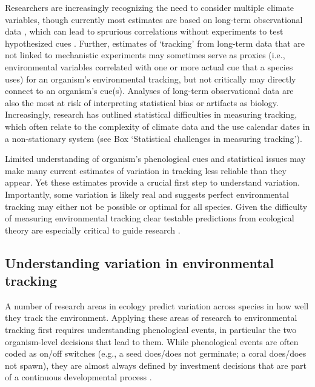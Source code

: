 \documentclass[11pt,letterpaper]{article}
\begin{document}
Researchers are increasingly recognizing the need to consider multiple climate variables, though currently most estimates are based on long-term observational data \citep[e.g.,][]{chmiel2013,simmonds2019}, which can lead to sprurious correlations without experiments to test hypothesized cues \citep{chuinearees}. Further, estimates of `tracking' from long-term data that are not linked to mechanistic experiments may sometimes serve as proxies (i.e., environmental variables correlated with one or more actual cue that a species uses) for an organism's environmental tracking, but not critically may directly connect to an organism's cue(s). Analyses of long-term observational data are also the most at risk of interpreting statistical bias or artifacts as biology. Increasingly, research has outlined statistical difficulties in measuring tracking, which often relate to the complexity of climate data and the use calendar dates in a non-stationary system (see Box `Statistical challenges in measuring tracking'). 

Limited understanding of organism's phenological cues and statistical issues may make many current estimates of variation in tracking less reliable than they appear. Yet these estimates provide a crucial first step to understand variation. Importantly, some variation is likely real and suggests perfect environmental tracking may either not be possible or optimal for all species. Given the difficulty of measuring environmental tracking clear testable predictions from ecological theory are especially critical to guide research \citep{Smaldino2016}. %

\subsection{Understanding variation in environmental tracking}
A number of research areas in ecology predict variation across species in how well they track the environment. Applying these areas of research to environmental tracking first requires understanding phenological events, in particular the two organism-level decisions that lead to them. While phenological events are often coded as on/off switches (e.g., a seed does/does not germinate; a coral does/does not spawn), they are almost always defined by investment decisions that are part of a continuous developmental process \cite{inouye2019}. 
\end{document}
